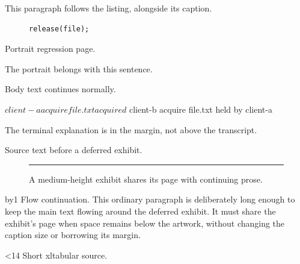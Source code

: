 This paragraph follows the listing, alongside its caption.
\clearpage
\begin{figure}[htbp]
\centering
\begin{minipage}{.92\textwidth}
\begin{lstlisting}[caption={A listing inside a narrow minipage and a float uses the page margin, not the minipage edge.},label={fixture:nested-listing}]
release(file);
\end{lstlisting}
\end{minipage}
\end{figure}
\clearpage
\noindent Portrait regression page.\par\vspace*{470pt}
\noindent The portrait belongs with this sentence.
\par Body text continues normally.
\clearpage
\begin{pdsession}
$ client-a acquire file.txt
acquired
$ client-b acquire file.txt
held by client-a
\end{pdsession}
The terminal explanation is in the margin, not above the transcript.
\clearpage
\noindent\rule{0pt}{290pt}Source text before a deferred exhibit.\par
\begin{figure}[!htbp]
\centering\rule{180pt}{350pt}
\caption{A medium-height exhibit shares its page with continuing prose.}
\label{fixture:shared-float-page}
\end{figure}
\newcount\pdflowtestcount{}
\loop
  \advance\pdflowtestcount by1
  \noindent Flow continuation. This ordinary paragraph is deliberately long
  enough to keep the main text flowing around the deferred exhibit. It must
  share the exhibit's page when space remains below the artwork, without
  changing the caption size or borrowing its margin.\par
\ifnum\pdflowtestcount<14\repeat
\clearpage
\noindent Short xltabular source.\par\vspace*{390pt}

